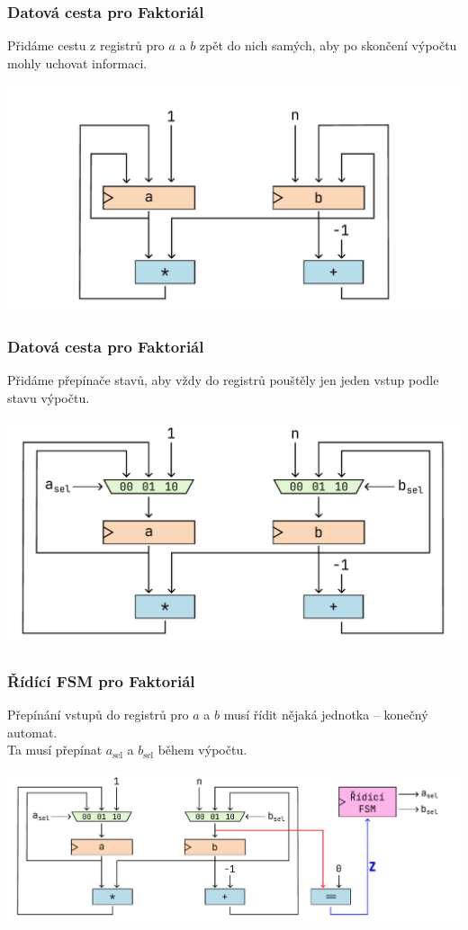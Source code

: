 \documentclass[aspectratio=169,11pt,svgnames]{beamer}
\begin{document}
\begin{frame}
 \frametitle{Datová cesta pro Faktoriál}
 Přidáme cestu z registrů pro $a$ a $b$ zpět do nich samých, aby po skončení
 výpočtu mohly uchovat informaci.
 \begin{center}
  \includegraphics[width=.75\textwidth]{factorial-circuit-6.pdf}
 \end{center}
\end{frame}

\begin{frame}
 \frametitle{Datová cesta pro Faktoriál}
 Přidáme přepínače stavů, aby vždy do registrů pouštěly jen jeden vstup podle
 stavu výpočtu.
 \begin{center}
  \includegraphics[width=.75\textwidth]{factorial-circuit-7.pdf}
 \end{center}
\end{frame}

\begin{frame}
 \frametitle{Řídící FSM pro Faktoriál}
 Přepínání vstupů do registrů pro $a$ a $b$ musí řídit nějaká jednotka --
 konečný automat.\pause\\
 Ta musí přepínat $a_{\text{sel}}$ a $b_{\text{sel}}$ během výpočtu.
 \begin{center}
  \includegraphics[width=\textwidth]{factorial-circuit-8.pdf}
 \end{center}
\end{frame}
\end{document}

